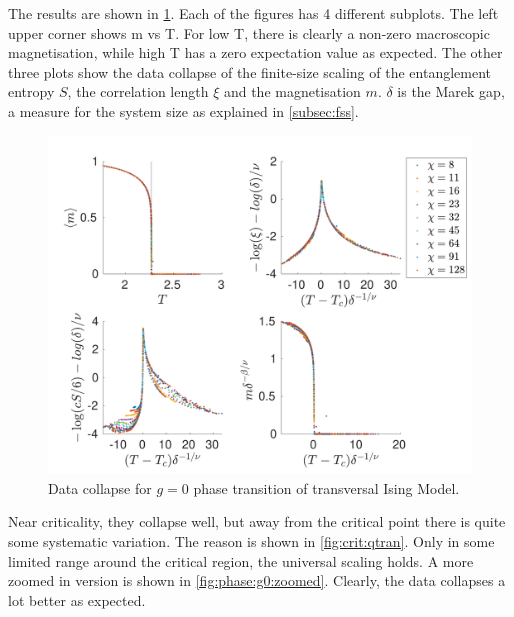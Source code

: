 The results are shown in \cref{fig:phase:g0:full}. Each of the figures has 4 different subplots. The left upper corner shows m vs T. For low T, there is clearly a non-zero macroscopic magnetisation, while high T has a zero expectation value as expected. The other three plots show the data collapse of the finite-size scaling of the entanglement entropy $S$, the correlation length $\xi$ and the magnetisation $m$. $\delta$ is the Marek gap, a measure for the system size as explained in \cref{subsec:fss}.
\begin{figure}[h!]
    \center
    \includegraphics[width=\textwidth]{Figuren/phasediag/g0/Full.pdf}
    \caption{ Data collapse for $g=0$ phase transition of transversal Ising Model. }
    \label{fig:phase:g0:full}
\end{figure}
Near criticality, they collapse well, but away from the critical point there is quite some systematic variation. The reason is shown in \cref{fig:crit:qtran}. Only in some limited range around the critical region, the universal scaling holds. A more zoomed in version is shown in \cref{fig:phase:g0:zoomed}. Clearly, the data collapses a lot better as expected.
